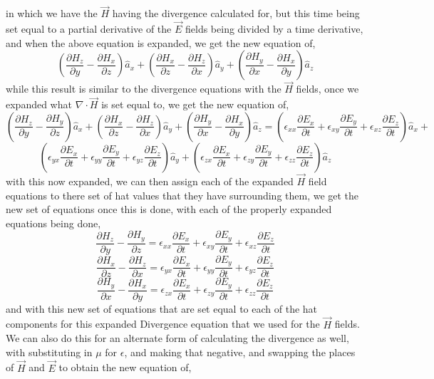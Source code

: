 \documentclass[]{article}
\begin{document}
in which we have the $\vec{H}$ having the divergence calculated for, but this time being set equal to a partial derivative of the $\vec{E}$ fields being divided by a time derivative, and when the above equation is expanded, we get the new equation of,
\begin{equation}
(\frac{\partial{H}_z}{\partial{y}} - \frac{\partial{H}_x}{\partial{z}})\hat{a}_x + (\frac{\partial{H}_x}{\partial{z}} - \frac{\partial{H}_z}{\partial{x}})\hat{a}_y + (\frac{\partial{H}_y}{\partial{x}} - \frac{\partial{H}_x}{\partial{y}})\hat{a}_z
\end{equation}
while this result is similar to the divergence equations with the $\vec{H}$ fields, once we expanded what $\nabla \cdot \vec{H}$ is set equal to, we get the new equation of,
\[(\frac{\partial{H}_z}{\partial{y}} - \frac{\partial{H}_y}{\partial{z}})\hat{a}_x + (\frac{\partial{H}_x}{\partial{z}} - \frac{\partial{H}_z}{\partial{x}})\hat{a}_y + (\frac{\partial{H}_y}{\partial{x}} - \frac{\partial{H}_x}{\partial{y}})\hat{a}_z = (\epsilon_{xx}\frac{\partial{E}_x}{\partial{t}} + \epsilon_{xy}\frac{\partial{E}_y}{\partial{t}} + \epsilon_{xz}\frac{\partial{E}_z}{\partial{t}})\hat{a}_x +\]
\[(\epsilon_{yx}\frac{\partial{E}_x}{\partial{t}} + \epsilon_{yy}\frac{\partial{E}_y}{\partial{t}} + \epsilon_{yz}\frac{\partial{E}_z}{\partial{t}})\hat{a}_y + (\epsilon_{zx}\frac{\partial{E}_x}{\partial{t}} + \epsilon_{zy}\frac{\partial{E}_y}{\partial{t}} + \epsilon_{zz}\frac{\partial{E}_z}{\partial{t}})\hat{a}_z\]
with this now expanded, we can then assign each of the expanded $\vec{H}$ field equations to there set of hat values that they have surrounding them, we get the new set of equations once this is done, with each of the properly expanded equations being done,
\[\frac{\partial{H}_z}{\partial{y}} - \frac{\partial{H}_y}{\partial{z}} = \epsilon_{xx}\frac{\partial{E}_x}{\partial{t}} + \epsilon_{xy}\frac{\partial{E}_y}{\partial{t}} + \epsilon_{xz}\frac{\partial{E}_z}{\partial{t}} \]
\[\frac{\partial{H}_x}{\partial{z}} - \frac{\partial{H}_z}{\partial{x}} = \epsilon_{yx}\frac{\partial{E}_x}{\partial{t}} + \epsilon_{yy}\frac{\partial{E}_y}{\partial{t}} + \epsilon_{yz}\frac{\partial{E}_z}{\partial{t}} \]
\[\frac{\partial{H}_y}{\partial{x}} - \frac{\partial{H}_x}{\partial{y}} = \epsilon_{zx}\frac{\partial{E}_x}{\partial{t}} + \epsilon_{zy}\frac{\partial{E}_y}{\partial{t}} + \epsilon_{zz}\frac{\partial{E}_z}{\partial{t}}\]
and with this new set of equations that are set equal to each of the hat components for this expanded Divergence equation that we used for the $\vec{H}$ fields. We can also do this for an alternate form of calculating the divergence as well, with substituting in $\mu$ for $\epsilon$, and making that negative, and swapping the places of $\vec{H}$ and $\vec{E}$ to obtain the new equation of,
\end{document}
